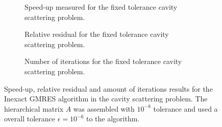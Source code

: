 \begin{figure}[h!]
    \centering
    \begin{subfigure}[b]{0.6\linewidth}
        
        \caption{Speed-up measured for the fixed tolerance cavity scattering problem.}
    \end{subfigure}
    \begin{subfigure}[b]{0.4\linewidth}
        
        \caption{Relative residual for the fixed tolerance cavity scattering problem.}
    \end{subfigure}
    \begin{subfigure}[b]{0.4\linewidth}
        
        \caption{Number of iterations for the fixed tolerance cavity scattering problem.}
    \end{subfigure}
    \caption{Speed-up, relative residual and amount of iterations results for the Inexact GMRES algorithm in the cavity scattering problem. The hierarchical matrix $A$ was assembled with $10^{-8}$ tolerance and used a overall tolerance $\epsilon = 10^{-6}$ to the algorithm.}
    \label{fig:cavity_resultsfixtol}
\end{figure}
